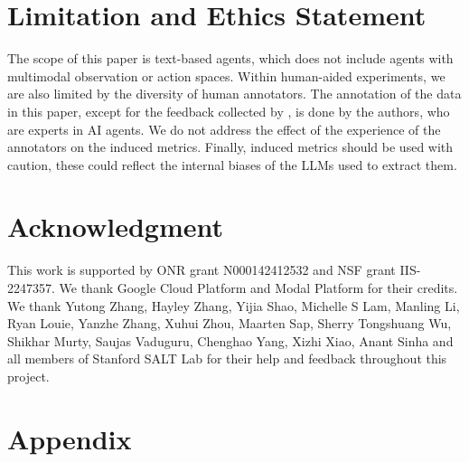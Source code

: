 \documentclass{article} %
\begin{document}
\section*{Limitation and Ethics Statement}
The scope of this paper is text-based agents, which does not include agents with multimodal observation or action spaces. Within human-aided experiments, we are also limited by the diversity of human annotators. The annotation of the data in this paper, except for the feedback collected by \citet{shao2024collaborative}, is done by the authors, who are experts in AI agents. We do not address the effect of the experience of the annotators on the induced metrics. Finally, induced metrics should be used with caution, these could reflect the internal biases of the LLMs used to extract them. 

\section*{Acknowledgment}
This work is supported by ONR grant N000142412532 and NSF grant IIS-2247357.  We thank Google Cloud Platform and Modal Platform for their credits.
We thank Yutong Zhang, Hayley Zhang, Yijia Shao, Michelle S Lam, Manling Li, Ryan Louie, Yanzhe Zhang, Xuhui Zhou, Maarten Sap, Sherry Tongshuang Wu, Shikhar Murty, Saujas Vaduguru, Chenghao Yang, Xizhi Xiao, Anant Sinha and all members of Stanford SALT Lab for their help and feedback throughout this project. 





\newpage
\appendix
\section*{Appendix}

\end{document}
